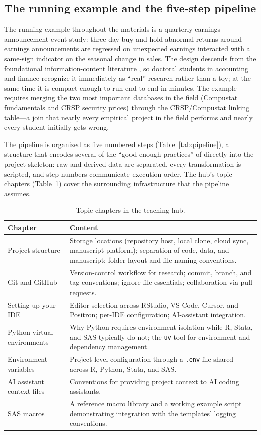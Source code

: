 \documentclass[12pt]{article}
\begin{document}
\subsection{The running example and the five-step pipeline}

The running example throughout the materials is a quarterly
earnings-announcement event study: three-day buy-and-hold abnormal
returns around earnings announcements are regressed on unexpected
earnings interacted with a same-sign indicator on the seasonal change in
sales. The design descends from the foundational information-content
literature \citep{ballbrown1968}, so doctoral students in accounting and
finance recognize it immediately as ``real'' research rather than a toy;
at the same time it is compact enough to run end to end in minutes. The
example requires merging the two most important databases in the field
(Compustat fundamentals and CRSP security prices) through the
CRSP/Compustat linking table---a join that nearly every empirical project
in the field performs and nearly every student initially gets wrong.

The pipeline is organized as five numbered steps
(Table~\ref{tab:pipeline}), a structure that encodes several of the ``good
enough practices'' of \citet{wilson2017good} directly into the project
skeleton: raw and derived data are separated, every transformation is
scripted, and step numbers communicate execution order. The hub's topic
chapters (Table~\ref{tab:chapters}) cover the surrounding infrastructure
that the pipeline assumes.

\begin{table}[htbp]
\centering
\caption{Topic chapters in the teaching hub.}
\label{tab:chapters}
\small
\begin{tabularx}{\textwidth}{@{}lX@{}}
\toprule
\textbf{Chapter} & \textbf{Content} \\
\midrule
Project structure & Storage locations (repository host, local clone,
cloud sync, manuscript platform); separation of code, data, and
manuscript; folder layout and file-naming conventions. \\
Git and GitHub & Version-control workflow for research; commit, branch,
and tag conventions; ignore-file essentials; collaboration via pull
requests. \\
Setting up your IDE & Editor selection across RStudio, VS Code, Cursor,
and Positron; per-IDE configuration; AI-assistant integration. \\
Python virtual environments & Why Python requires environment isolation
while R, Stata, and SAS typically do not; the \texttt{uv} tool for
environment and dependency management. \\
Environment variables & Project-level configuration through a
\texttt{.env} file shared across R, Python, Stata, and SAS. \\
AI assistant context files & Conventions for providing project context to
AI coding assistants. \\
SAS macros & A reference macro library and a working example script
demonstrating integration with the templates' logging conventions. \\
\bottomrule
\end{tabularx}
\end{table}
\end{document}
